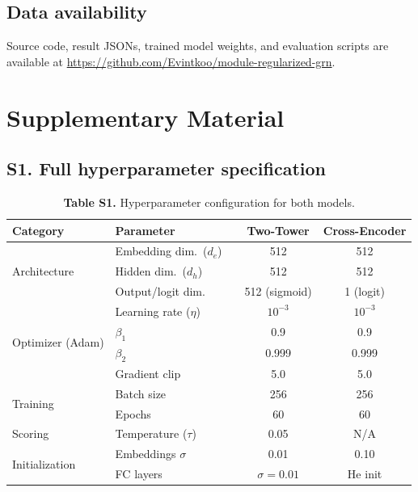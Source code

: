 \documentclass[10pt,twocolumn]{article}
\begin{document}
\subsection*{Data availability}
Source code, result JSONs, trained model weights, and evaluation scripts are
available at \url{https://github.com/Evintkoo/module-regularized-grn}.





\clearpage
\onecolumn
\appendix
\section*{Supplementary Material}

\subsection*{S1. Full hyperparameter specification}

\begin{table}[H]
\centering
\caption*{\textbf{Table S1.} Hyperparameter configuration for both models.}
\small
\begin{tabular}{@{}lllcc@{}}
\toprule
\textbf{Category} & \textbf{Parameter} & & \textbf{Two-Tower} & \textbf{Cross-Encoder} \\
\midrule
\multirow{3}{*}{Architecture}
  & Embedding dim.\ ($d_e$)   & & 512 & 512 \\
  & Hidden dim.\ ($d_h$)      & & 512 & 512 \\
  & Output/logit dim.         & & 512 (sigmoid) & 1 (logit) \\
\midrule
\multirow{4}{*}{Optimizer (Adam)}
  & Learning rate ($\eta$)    & & $10^{-3}$ & $10^{-3}$ \\
  & $\beta_1$                 & & 0.9 & 0.9 \\
  & $\beta_2$                 & & 0.999 & 0.999 \\
  & Gradient clip             & & 5.0 & 5.0 \\
\midrule
\multirow{2}{*}{Training}
  & Batch size                & & 256 & 256 \\
  & Epochs                    & & 60 & 60 \\
\midrule
Scoring
  & Temperature ($\tau$)      & & 0.05 & N/A \\
\midrule
\multirow{2}{*}{Initialization}
  & Embeddings $\sigma$       & & 0.01 & 0.10 \\
  & FC layers                 & & $\sigma=0.01$ & He init \\
\bottomrule
\end{tabular}
\end{table}
\end{document}

